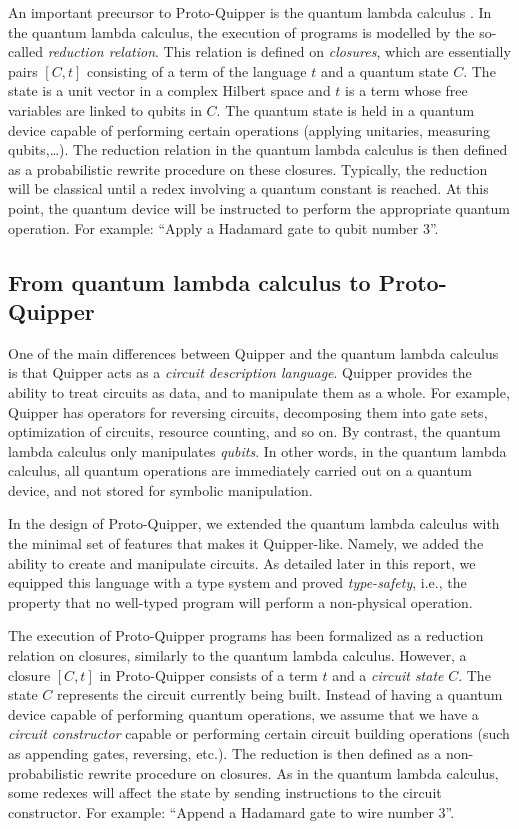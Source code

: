 \documentclass[twoside]{article}
\begin{document}
An important precursor to Proto-Quipper is the quantum lambda calculus
{\cite{SeVa09}}. In the quantum lambda calculus, the execution of
programs is modelled by the so-called {\em reduction relation}. This
relation is defined on \emph{closures}, which are essentially pairs
$[C,t]$ consisting of a term of the language $t$ and a quantum state
$C$. The state is a unit vector in a complex Hilbert space and $t$ is
a term whose free variables are linked to qubits in $C$. The quantum
state is held in a quantum device capable of performing certain
operations (applying unitaries, measuring qubits,\ldots). The
reduction relation in the quantum lambda calculus is then defined as a
probabilistic rewrite procedure on these closures. Typically, the
reduction will be classical until a redex involving a quantum constant
is reached. At this point, the quantum device will be instructed to
perform the appropriate quantum operation. For example: ``Apply a
Hadamard gate to qubit number 3''.

\subsection{From quantum lambda calculus to Proto-Quipper}

One of the main differences between Quipper and the quantum lambda
calculus is that Quipper acts as a {\em circuit description language}.
Quipper provides the ability to treat circuits as data, and to
manipulate them as a whole.  For example, Quipper has operators for
reversing circuits, decomposing them into gate sets, optimization of
circuits, resource counting, and so on. By contrast, the quantum
lambda calculus only manipulates {\em qubits}. In other words, in
the quantum lambda calculus, all quantum operations are immediately
carried out on a quantum device, and not stored for symbolic
manipulation.

In the design of Proto-Quipper, we extended the quantum lambda
calculus with the minimal set of features that makes it Quipper-like.
Namely, we added the ability to create and manipulate circuits.  As
detailed later in this report, we equipped this language with a type
system and proved {\em type-safety}, i.e., the property that no
well-typed program will perform a non-physical operation.

The execution of Proto-Quipper programs has been formalized as a
reduction relation on closures, similarly to the quantum lambda
calculus.  However, a closure $[C,t]$ in Proto-Quipper consists of a
term $t$ and a \emph{circuit state} $C$. The state $C$ represents the
circuit currently being built. Instead of having a quantum device
capable of performing quantum operations, we assume that we have a
\emph{circuit constructor} capable or performing certain circuit
building operations (such as appending gates, reversing, etc.). The
reduction is then defined as a non-probabilistic rewrite procedure on
closures.  As in the quantum lambda calculus, some redexes will affect
the state by sending instructions to the circuit constructor. For
example: ``Append a Hadamard gate to wire number 3''.
\end{document}
